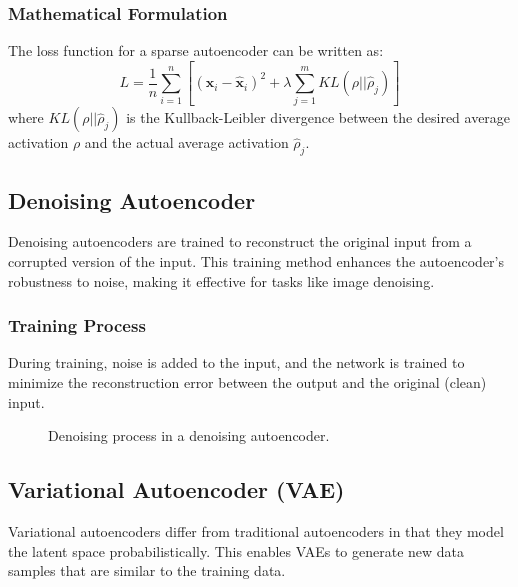 \documentclass{article}
\begin{document}
\subsubsection{Mathematical Formulation}

The loss function for a sparse autoencoder can be written as:
\[
L = \frac{1}{n} \sum_{i=1}^{n} \left[ (\mathbf{x}_i - \mathbf{\hat{x}}_i)^2 + \lambda \sum_{j=1}^{m} KL(\rho || \hat{\rho}_j) \right]
\]
where \( KL(\rho || \hat{\rho}_j) \) is the Kullback-Leibler divergence between the desired average activation \( \rho \) and the actual average activation \( \hat{\rho}_j \).

\subsection{Denoising Autoencoder}

Denoising autoencoders are trained to reconstruct the original input from a corrupted version of the input. This training method enhances the autoencoder's robustness to noise, making it effective for tasks like image denoising.

\subsubsection{Training Process}

During training, noise is added to the input, and the network is trained to minimize the reconstruction error between the output and the original (clean) input.

\begin{figure}[h]
    \centering
    \caption{Denoising process in a denoising autoencoder.}
    \label{fig:denoising}
\end{figure}

\subsection{Variational Autoencoder (VAE)}

Variational autoencoders differ from traditional autoencoders in that they model the latent space probabilistically. This enables VAEs to generate new data samples that are similar to the training data.
\end{document}
